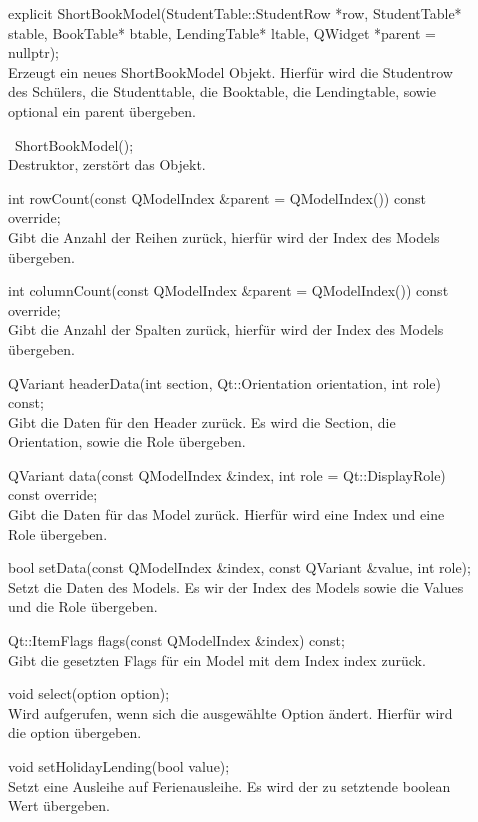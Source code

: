 \begin{description}	
    \item[ ] explicit ShortBookModel(StudentTable::StudentRow *row, StudentTable* stable, BookTable* btable, LendingTable* ltable, QWidget *parent = nullptr); \\
    Erzeugt ein neues ShortBookModel Objekt. Hierfür wird die Studentrow des Schülers, die Studenttable, die Booktable, die Lendingtable, sowie optional ein parent übergeben.
    \item[ ] ~ShortBookModel(); \\
    Destruktor, zerstört das Objekt.
    \item[ ] int rowCount(const QModelIndex \&parent = QModelIndex()) const override; \\
    Gibt die Anzahl der Reihen zurück, hierfür wird der Index des Models übergeben.
    \item[ ] int columnCount(const QModelIndex \&parent = QModelIndex()) const override; \\
    Gibt die Anzahl der Spalten zurück, hierfür wird der Index des Models übergeben.
    \item[ ] QVariant headerData(int section, Qt::Orientation orientation, int role) const; \\
    Gibt die Daten für den Header zurück. Es wird die Section, die Orientation, sowie die Role übergeben.
    \item[ ] QVariant data(const QModelIndex \&index, int role = Qt::DisplayRole) const override; \\
    Gibt die Daten für das Model zurück. Hierfür wird eine Index und eine Role übergeben.
    \item[ ] bool setData(const QModelIndex \&index, const QVariant \&value, int role); \\
    Setzt die Daten des Models. Es wir der Index des Models sowie die Values und die Role übergeben.
    \item[ ] Qt::ItemFlags flags(const QModelIndex \&index) const; \\
    Gibt die gesetzten Flags für ein Model mit dem Index index zurück.
    \item[ ] void select(option option); \\
    Wird aufgerufen, wenn sich die ausgewählte Option ändert. Hierfür wird die option übergeben.
    \item[ ] void setHolidayLending(bool value); \\
    Setzt eine Ausleihe auf Ferienausleihe. Es wird der zu setztende boolean Wert übergeben.
\end{description}

